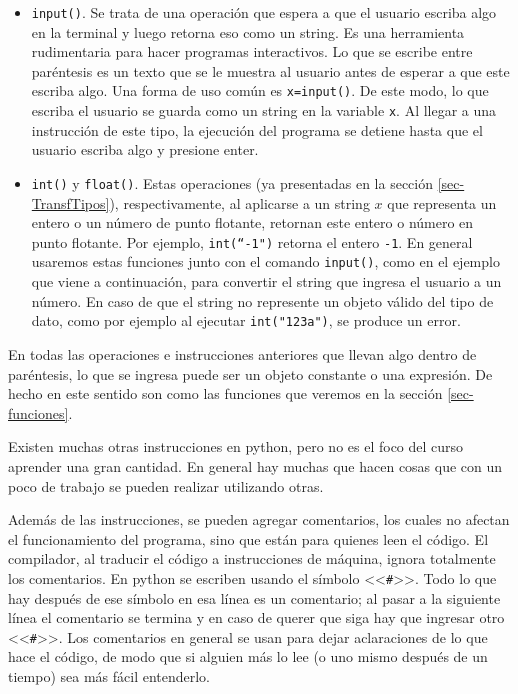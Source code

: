\documentclass[a4paper, 12pt]{report}
\theoremstyle{definition}
\begin{document}
\begin{itemize}
	\item {\tt input()}. Se trata de una operación que espera a que el usuario escriba algo en la terminal y luego retorna eso como un string. Es una herramienta rudimentaria para hacer programas interactivos. Lo que se escribe entre paréntesis es un texto que se le muestra al usuario antes de esperar a que este escriba algo. Una forma de uso común es  {\tt x=input()}. De este modo, lo que escriba el usuario se guarda como un string en la variable {\tt x}. Al llegar a una instrucción de este tipo, la ejecución del programa se detiene hasta que el usuario escriba algo y presione enter.
	
	\item {\tt int()} y {\tt float()}. Estas operaciones (ya presentadas en la sección \ref{sec-TransfTipos}), respectivamente, al aplicarse a un string $x$ que representa un entero o un número de punto flotante, retornan este entero o número en punto flotante. Por ejemplo, {\tt int(``-1")} retorna el entero {\tt -1}. En general usaremos estas funciones junto con el comando {\tt input()}, como en el ejemplo que viene a continuación, para convertir el string que ingresa el usuario a un número. En caso de que el string no represente un objeto válido del tipo de dato, como por ejemplo al ejecutar {\tt int("123a")}, se produce un error.
\end{itemize}

En todas las operaciones e instrucciones anteriores que llevan algo dentro de paréntesis, lo que se ingresa puede ser un objeto constante o una expresión. De hecho en este sentido son como las funciones que veremos en la sección \ref{sec-funciones}.

Existen muchas otras instrucciones en python, pero no es el foco del curso aprender una gran cantidad. En general hay muchas que hacen cosas que con un poco de trabajo se pueden realizar utilizando otras.

Además de las instrucciones, se pueden agregar comentarios, los cuales no afectan el funcionamiento del programa, sino que están para quienes leen el código. El compilador, al traducir el código a instrucciones de máquina, ignora totalmente los comentarios. En python se escriben usando el símbolo <<{\tt\#}>>. Todo lo que hay después de ese símbolo en esa línea es un comentario; al pasar a la siguiente línea el comentario se termina y en caso de querer que siga hay que ingresar otro <<{\tt\#}>>. Los comentarios en general se usan para dejar aclaraciones de lo que hace el código, de modo que si alguien más lo lee (o uno mismo después de un tiempo) sea más fácil entenderlo.
\end{document}
